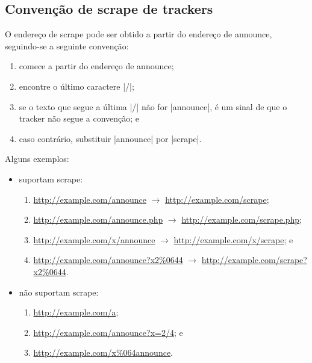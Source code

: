
\newpage
\subsection*{Convenção de scrape de trackers}

O endereço de \gls*{scrape} pode ser obtido a partir do endereço de \gls*{announce},
seguindo-se a seguinte convenção:

\begin{enumerate}
    \item comece a partir do endereço de \gls*{announce};

    \item encontre o último caractere \sverb|/|;

    \item se o texto que segue a última \sverb|/| não for \sverb|announce|, é um sinal
        de que o \gls*{tracker} não segue a convenção; e

    \item caso contrário, substituir \sverb|announce| por \sverb|scrape|.
\end{enumerate}

Alguns exemplos:

\begin{itemize}
    \item suportam scrape:
        \begin{enumerate}
            \item \url{http://example.com/announce} $\rightarrow$
                \url{http://example.com/scrape};
            \item \url{http://example.com/announce.php} $\rightarrow$
                \url{http://example.com/scrape.php};
            \item \url{http://example.com/x/announce} $\rightarrow$
                \url{http://example.com/x/scrape}; e
            \item \url{http://example.com/announce?x2\%0644} $\rightarrow$
                \url{http://example.com/scrape?x2\%0644}.
        \end{enumerate}

    \item não suportam scrape:
        \begin{enumerate}
            \item \url{http://example.com/a};
            \item \url{http://example.com/announce?x=2/4}; e
            \item \url{http://example.com/x\%064announce}.
        \end{enumerate}
\end{itemize}